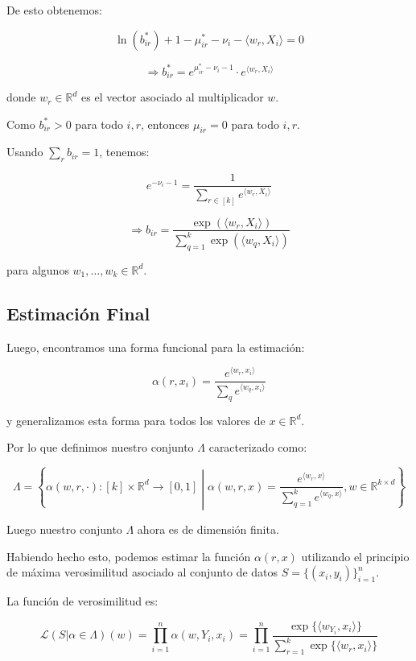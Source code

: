 De esto obtenemos:

\[ \ln(b_{ir}^*) + 1 - \mu_{ir}^* - \nu_i - \langle w_r, X_i \rangle = 0 \]

\[ \Rightarrow b_{ir}^* = e^{\mu_{ir}^* - \nu_i - 1} \cdot e^{\langle w_r, X_i \rangle} \]

donde \( w_r \in \mathbb{R}^d \) es el vector asociado al multiplicador \( w \).

Como \( b_{ir}^* > 0 \) para todo \( i,r \), entonces \( \mu_{ir} = 0 \) para todo \( i,r \).

Usando \( \sum_{r} b_{ir} = 1 \), tenemos:

\[ e^{-\nu_i - 1} = \frac{1}{\sum_{r \in [k]} e^{\langle w_r, X_i \rangle}} \]

\[ \Rightarrow b_{ir} = \frac{\exp(\langle w_r, X_i \rangle)}{\sum_{q=1}^{k} \exp(\langle w_q, X_i \rangle)} \]

para algunos \( w_1, \ldots, w_k \in \mathbb{R}^d \).

\subsection{Estimación Final}

Luego, encontramos una forma funcional para la estimación:

\[ \alpha(r, x_i) = \frac{e^{\langle w_r, x_i \rangle}}{\sum_{q} e^{\langle w_q, x_i \rangle}} \]

y generalizamos esta forma para todos los valores de \( x \in \mathbb{R}^d \).

Por lo que definimos nuestro conjunto \( \Lambda \) caracterizado como:

\[ \Lambda = \left\{ \alpha(w, r, \cdot) : [k] \times \mathbb{R}^d \rightarrow [0,1] \middle| \alpha(w, r, x) = \frac{e^{\langle w_r, x \rangle}}{\sum_{q=1}^{k} e^{\langle w_q, x \rangle}}, w \in \mathbb{R}^{k \times d} \right\} \]

Luego nuestro conjunto \( \Lambda \) ahora es de dimensión finita.

Habiendo hecho esto, podemos estimar la función \( \alpha(r, x) \) utilizando el principio de máxima verosimilitud asociado al conjunto de datos \( S = \{(x_i, y_i)\}_{i=1}^n \).

La función de verosimilitud es:

\[ \mathcal{L}(S|\alpha \in \Lambda)(w) = \prod_{i=1}^{n} \alpha(w, Y_i, x_i) = \prod_{i=1}^{n} \frac{\exp\{\langle w_{Y_i}, x_i \rangle\}}{\sum_{r=1}^{k} \exp\{\langle w_r, x_i \rangle\}} \]

